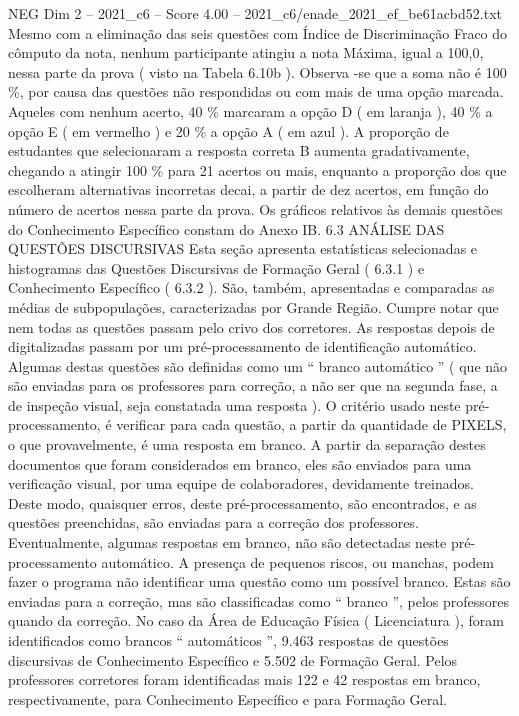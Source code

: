 \begin{textsample}{NEG Dim 2 – 2021\_c6 – Score 4.00 – 2021\_c6/enade\_2021\_ef\_be61acbd52.txt}
Mesmo com a eliminação das seis questões com Índice de Discriminação Fraco do cômputo da nota, nenhum participante atingiu a nota Máxima, igual a 100,0, nessa parte da prova ( visto na Tabela 6.10b ).
Observa -se que a soma não é 100 \%, por causa das questões não respondidas ou com mais de uma opção marcada.
Aqueles com nenhum acerto, 40 \% marcaram a opção D ( em laranja ), 40 \% a opção E ( em vermelho ) e 20 \% a opção A ( em azul ).
A proporção de estudantes que selecionaram a resposta correta B aumenta gradativamente, chegando a atingir 100 \% para 21 acertos ou mais, enquanto a proporção dos que escolheram alternativas incorretas decai, a partir de dez acertos, em função do número de acertos nessa parte da prova.
Os gráficos relativos às demais questões do Conhecimento Específico constam do Anexo IB. 6.3 ANÁLISE DAS QUESTÕES DISCURSIVAS Esta seção apresenta estatísticas selecionadas e histogramas das Questões Discursivas de Formação Geral ( 6.3.1 ) e Conhecimento Específico ( 6.3.2 ).
São, também, apresentadas e comparadas as médias de subpopulações, caracterizadas por Grande Região.
Cumpre notar que nem todas as questões passam pelo crivo dos corretores.
As respostas depois de digitalizadas passam por um pré-processamento de identificação automático.
Algumas destas questões são definidas como um “ branco automático ” ( que não são enviadas para os professores para correção, a não ser que na segunda fase, a de inspeção visual, seja constatada uma resposta ).
O critério usado neste pré-processamento, é verificar para cada questão, a partir da quantidade de PIXELS, o que provavelmente, é uma resposta em branco.
A partir da separação destes documentos que foram considerados em branco, eles são enviados para uma verificação visual, por uma equipe de colaboradores, devidamente treinados.
Deste modo, quaisquer erros, deste pré-processamento, são encontrados, e as questões preenchidas, são enviadas para a correção dos professores.
Eventualmente, algumas respostas em branco, não são detectadas neste pré-processamento automático.
A presença de pequenos riscos, ou manchas, podem fazer o programa não identificar uma questão como um possível branco.
Estas são enviadas para a correção, mas são classificadas como “ branco ”, pelos professores quando da correção.
No caso da Área de Educação Física ( Licenciatura ), foram identificados como brancos “ automáticos ”, 9.463 respostas de questões discursivas de Conhecimento Específico e 5.502 de Formação Geral.
Pelos professores corretores foram identificadas mais 122 e 42 respostas em branco, respectivamente, para Conhecimento Específico e para Formação Geral.

\end{textsample}

